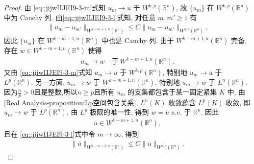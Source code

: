 \documentclass[../../main.tex]{subfiles}
\begin{document}
\begin{proof}
由 \eqref{eq::jijwIIJEI9-3-m}式知 $u_{m}\to\overline{u}$ 于 $W^{k,p}(\mathbb{R}^{n})$, 故 $\{u_{m}\}$ 在 $W^{k,p}(\mathbb{R}^{n})$ 中为 Cauchy 列. 由\eqref{eq::jijwIIJEI9-3-l}式知, 对任意 $m,m'\geqslant1$ 有
\begin{align}\label{eq::jijwIIJEI9-3-cauchy}
\|u_{m}-u_{m'}\|_{W^{k-m+1,n}(\mathbb{R}^{n})}\leqslant C\|u_{m}-u_{m'}\|_{W^{k,p}(\mathbb{R}^{n})}.
\end{align}
因此 $\{u_{m}\}$ 在 $W^{k-m+1,n}(\mathbb{R}^{n})$ 中也是 Cauchy 列. 由于 $W^{k-m+1,n}(\mathbb{R}^{n})$ 完备, 存在 $w\in W^{k-m+1,n}(\mathbb{R}^{n})$ 使得
\begin{align*}
u_{m}\to w\quad\text{于}\ W^{k-m+1,n}(\mathbb{R}^{n}).
\end{align*}
又由 \eqref{eq::jijwIIJEI9-3-m}式知 $u_{m}\to\overline{u}$ 于 $W^{k,p}(\mathbb{R}^{n})$, 特别地 $u_{m}\to\overline{u}$ 于 $L^{p}(\mathbb{R}^{n})$. 另一方面, $u_{m}\to w$ 于 $W^{k-m+1,n}(\mathbb{R}^{n})$, 特别地 $u_{m}\to w$ 于 $L^{n}(\mathbb{R}^{n})$. 因为$\frac{n}{p}>0$且是整数,所以$n\geqslant p$且所有 $u_{m}$ 的支集都包含于某一固定紧集 $K$ 中, 由\cref{Real Analysis-proposition:Lp空间包含关系}, $L^{n}(K)$ 收敛蕴含 $L^{p}(K)$ 收敛, 即 $u_{m}\to w$ 于 $L^{p}(\mathbb{R}^{n})$. 由 $L^{p}$ 极限的唯一性, 得到 $w=\overline{u}$ a.e. 于 $\mathbb{R}^{n}$. 因此
\begin{align*}
\overline{u}\in W^{k-m+1,n}(\mathbb{R}^{n}),
\end{align*}
且在 \eqref{eq::jijwIIJEI9-3-l}式中令 $m\to\infty$, 得到
\begin{align}\label{eq::jijwIIJEI9-3-bar}
\|\overline{u}\|_{W^{k-m+1,n}(\mathbb{R}^{n})}\leqslant C\|\overline{u}\|_{W^{k,p}(\mathbb{R}^{n})}.
\end{align}


\end{proof}
\end{document}
